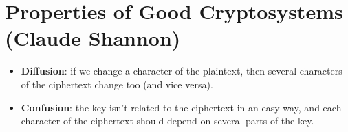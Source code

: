 \documentclass[12pt]{amsart}
\theoremstyle{plain}
\theoremstyle{definition}
\theoremstyle{remark}
\begin{document}
\vspace{.5in}

\section{Properties of Good Cryptosystems (Claude Shannon)}
\begin{itemize}
	\item \textbf{Diffusion}: if we change a character of the plaintext, then several characters of the ciphertext change too (and vice versa).
	\item \textbf{Confusion}: the key isn't related to the ciphertext in an easy way, and each character of the ciphertext should depend on several parts of the key.
\end{itemize}
\end{document}
